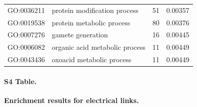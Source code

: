 \documentclass[10pt,letterpaper]{article}
\begin{document}
\begin{table}[]
\begin{tabular}{llll}
GO:0036211 & protein modification process                                                                                  & 51       & 0.00357 \\
GO:0019538 & protein metabolic process                                                                                     & 80       & 0.00376 \\
GO:0007276 & gamete generation                                                                                             & 16       & 0.00445 \\
GO:0006082 & organic acid metabolic process                                                                                & 11       & 0.00449 \\
GO:0043436 & oxoacid metabolic process                                                                                     & 11       & 0.00449\\ \hline
\end{tabular}
\end{table}

\paragraph*{S4 Table.}
{\bf Enrichment results for electrical links.}
\end{document}
